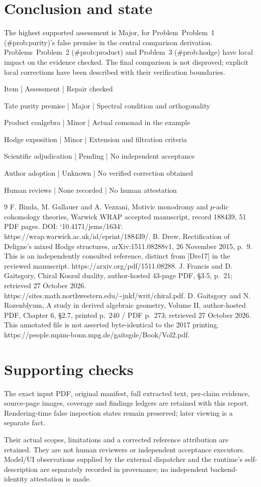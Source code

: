 \documentclass[10pt]{article}
\begin{document}
\section*{Conclusion and state}
The highest supported assessment is Major, for Problem Problem 1 (\#prob:purity)’s false premise in the central comparison derivation. Problems Problem 2 (\#prob:product) and Problem 3 (\#prob:hodge) have local impact on the evidence checked. The final comparison is not disproved; explicit local corrections have been described with their verification boundaries.\par
Item | Assessment | Repair checked\par
Tate purity premise | Major | Spectral condition and orthogonality\par
Product coalgebra | Minor | Actual comonad in the example\par
Hodge exposition | Minor | Extension and filtration criteria\par
Scientific adjudication | Pending | No independent acceptance\par
Author adoption | Unknown | No verified correction obtained\par
Human reviews | None recorded | No human attestation\par
9 F. Binda, M. Gallauer and A. Vezzani, Motivic monodromy and \(p\)-adic cohomology theories, Warwick WRAP accepted manuscript, record 188439, 51 PDF pages. DOI: `10.4171/jems/1634`. https://wrap.warwick.ac.uk/id/eprint/188439/. B. Drew, Rectification of Deligne’s mixed Hodge structures, arXiv:1511.08288v1, 26 November 2015, p. 9. This is an independently consulted reference, distinct from [Dre17] in the reviewed manuscript. https://arxiv.org/pdf/1511.08288. J. Francis and D. Gaitsgory, Chiral Koszul duality, author-hosted 43-page PDF, §3.5, p. 21; retrieved 27 October 2026. https://sites.math.northwestern.edu/\textasciitilde{}jnkf/writ/chiral.pdf. D. Gaitsgory and N. Rozenblyum, A study in derived algebraic geometry, Volume II, author-hosted PDF, Chapter 6, §2.7, printed p. 240 / PDF p. 273; retrieved 27 October 2026. This annotated file is not asserted byte-identical to the 2017 printing. https://people.mpim-bonn.mpg.de/gaitsgde/Book/Vol2.pdf.\par
\section*{Supporting checks}
The exact input PDF, original manifest, full extracted text, per-claim evidence, source-page images, coverage and findings ledgers are retained with this report. Rendering-time false inspection states remain preserved; later viewing is a separate fact.\par
Their actual scopes, limitations and a corrected reference attribution are retained. They are not human reviewers or independent acceptance executors. Model/UI observations supplied by the external dispatcher and the runtime’s self-description are separately recorded in provenance; no independent backend-identity attestation is made.\par
\end{document}
